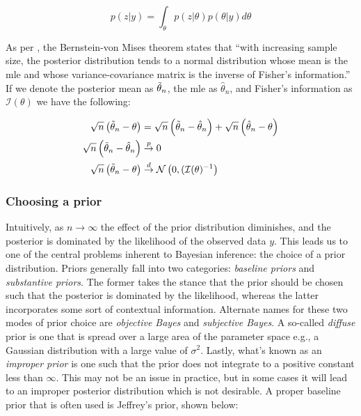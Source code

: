 \documentclass{report}
\begin{document}
\begin{equation}\label{eq:ols-bayes-predictive-distribution}
    p(z | y) = \int_\theta p(z | \theta) p(\theta | y) d\theta
\end{equation}

As per \cite[Chapter~3.3]{wakefield_bayesian_2013}, the Bernstein-von Mises theorem states that ``with increasing sample size, the posterior distribution tends to a normal distribution whose mean is the \gls{mle} and whose variance-covariance matrix is the inverse of Fisher's information.'' If we denote the posterior mean as $\Tilde{\theta}_n$, the \gls{mle} as $\hat{\theta}_n$, and Fisher's information as $\mathcal{I}(\theta)$ we have the following:

\begin{equation}\label{eq:ols-bayes-posterior-mean-asymptotics}
    \begin{aligned}
        \sqrt{n}\left(\Tilde{\theta}_n - \theta\right) &= \sqrt{n}\left(\Tilde{\theta}_n - \hat{\theta}_n\right) + \sqrt{n}\left(\hat{\theta}_n - \theta\right) \\
        \sqrt{n}\left(\Tilde{\theta}_n - \hat{\theta}_n\right) &\overset{p}{\to} 0 \\
        \sqrt{n}\left(\Tilde{\theta}_n - \theta\right) &\overset{d}{\to} \mathcal{N}\left(0, (\mathcal{I}(\theta)^{-1}\right) \\
    \end{aligned}
\end{equation}

\subsubsection{Choosing a prior}

Intuitively, as $n \to \infty$ the effect of the prior distribution diminishes, and the posterior is dominated by the likelihood of the observed data $y$. This leads us to one of the central problems inherent to Bayesian inference: the choice of a prior distribution. Priors generally fall into two categories: \textit{baseline priors} and \textit{substantive priors}. The former takes the stance that the prior should be chosen such that the posterior is dominated by the likelihood, whereas the latter incorporates some sort of contextual information. Alternate names for these two modes of prior choice are \textit{objective Bayes} and \textit{subjective Bayes}. A so-called \textit{diffuse} prior is one that is spread over a large area of the parameter space e.g., a Gaussian distribution with a large value of $\sigma^2$. Lastly, what's known as an \textit{improper prior} is one such that the prior does not integrate to a positive constant less than $\infty$. This may not be an issue in practice, but in some cases it will lead to an improper posterior distribution which is not desirable. A proper baseline prior that is often used is Jeffrey's prior, shown below:
\end{document}
